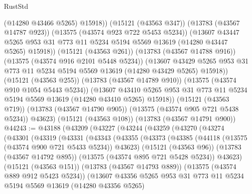 \begin{lexlean}{RustStd}
\begin{coremodule}
                (@14280 @43466 @5265)
                @15918))
            (@15121 (@43563 @347))
            (@13783 (@43567 @14787 @923))
            (@13575 (@43574 @923 @722 @5453 @5234))
            (@13607
              @43447
              @5265
              @953
              @31
              @773
              @11
              @5234
              @5194
              @5569
              @13619
              (@14280 @43447 @5265)
              @15918))
          (@15121 (@43563 @261))
          (@13783 (@43567 @14788 @916))
          (@13575 (@43574 @916 @2101 @5448 @5234))
          (@13607
            @43429
            @5265
            @953
            @31
            @773
            @11
            @5234
            @5194
            @5569
            @13619
            (@14280 @43429 @5265)
            @15918))
        (@15121 (@43563 @255))
        (@13783 (@43567 @14789 @910))
        (@13575 (@43574 @910 @1054 @5443 @5234))
        (@13607
          @43410
          @5265
          @953
          @31
          @773
          @11
          @5234
          @5194
          @5569
          @13619
          (@14280 @43410 @5265)
          @15918))
      (@15121 (@43563 @719))
      (@13783 (@43567 @14790 @905))
      (@13575 (@43574 @905 @721 @5438 @5234))
      @43623)
    (@15121 (@43563 @108))
    (@13783 (@43567 @14791 @900))
@44243 := @43188
    (@43209
      (@43227
        (@43244
          (@43259
            (@43270
              (@43274
                (@43301
                  (@43319
                    (@43331
                      (@43343
                        (@43355
                          (@43373
                            (@43385
                              (@44118 (@13575 (@43574 @900 @721 @5433 @5234)) @43623)
                              (@15121 (@43563 @96))
                              (@13783 (@43567 @14792 @895))
                              (@13575 (@43574 @895 @721 @5428 @5234))
                              @43623)
                            (@15121 (@43563 @151))
                            (@13783 (@43567 @14793 @889))
                            (@13575 (@43574 @889 @912 @5423 @5234))
                            (@13607
                              @43356
                              @5265
                              @953
                              @31
                              @773
                              @11
                              @5234
                              @5194
                              @5569
                              @13619
                              (@14280 @43356 @5265)

\end{coremodule}
\end{lexlean}
